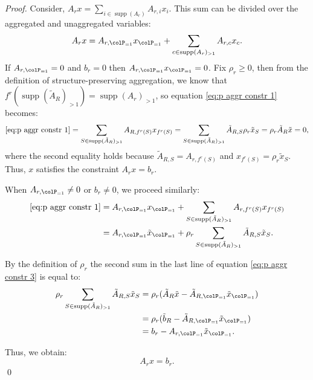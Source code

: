 \documentclass[smallextended,natbib]{svjour3}       %
\DeclareMathOperator{\supp}{supp}
\numberwithin{theorem}{section}
\begin{document}
\begin{proof}

 Consider, \(A_r x = \sum_{i \in \supp(A_r)} A_{r,i} x_i\). 
  This sum can be divided over the aggregated and unaggregated variables:
  \begin{equation}
    \label{eq:p aggr constr 1}
    A_r x =  A_{r, \colP_{=1}} x_{\colP_{=1}} + \sum_{c \in \supp(A_r)_{>1}}  A_{r, c} x_{c}  .
  \end{equation}
  If \(A_{r, \colP_{=1}} = 0\) and \(b_r = 0\) then \( A_{r, \colP_{=1}} x_{\colP_{=1}} = 0\). Fix \(\rho_r \geq 0\), then
  from the definition of structure-preserving aggregation, we know that \(f^r(\supp(\tilde{A}_R)_{>1}) = \supp(A_r)_{>1}\), so equation \eqref{eq:p aggr constr 1} becomes:
  \begin{equation}
    \label{eq:p aggr constr 2}
    \eqref{eq:p aggr constr 1} = \sum_{S \in \supp(\tilde{A}_R)_{>1}} A_{R, f^r(S)} x_{f^r(S)} =  \sum_{S \in \supp(\tilde{A}_R)_{>1}} \tilde{A}_{R, S} \rho_r \tilde{x}_S  = \rho_r \tilde{A}_R \tilde{x} = 0,
  \end{equation}
  where the second equality holds because \(\tilde{A}_{R, S} = A_{r, f^r(S)}\) and \(x_{f^r(S)} = \rho_r \tilde{x}_S\). Thus, \(x\) satisfies the constraint \(A_r x = b_r\).
  
  When \(A_{r, \colP_{=1}} \neq 0\) or \(b_r \neq 0\), we proceed similarly:
  \begin{align}
  \label{eq:p aggr constr 3}
 \eqref{eq:p aggr constr 1} &=A_{r, \colP_{=1}} x_{\colP_{=1}} + \sum_{S \in \supp(\tilde{A}_R)_{>1}} A_{r, f^r(S)} x_{f^r(S)}  \\
  &=  A_{r, \colP_{=1}} \tilde{x}_{\colP_{=1}} + \rho_r \sum_{S \in \supp(\tilde{A}_R)_{>1}} \tilde{A}_{R, S}  \tilde{x}_S.
  \end{align}
  
  By the definition of \(\rho_r\) the second sum in the last line of equation \eqref{eq:p aggr constr 3} is equal to:
  \begin{align*}
  \rho_r \sum_{S \in \supp(\tilde{A}_R)_{>1}} \tilde{A}_{R, S} \tilde{x}_S 
  &= \rho_r (\tilde{A}_R \tilde{x} - \tilde{A}_{R, \colP_{=1}} \tilde{x}_{\colP_{=1}}) \\
  &= \rho_r (\tilde{b}_R - \tilde{A}_{R, \colP_{=1}} \tilde{x}_{\colP_{=1}}) \\
  &= b_r - A_{r, \colP_{=1}} \tilde{x}_{\colP_{=1}}.
  \end{align*}
  
  Thus, we obtain:
  \[
  A_r x = b_r.
  \]
  \qed
  \end{proof}
\end{document}

